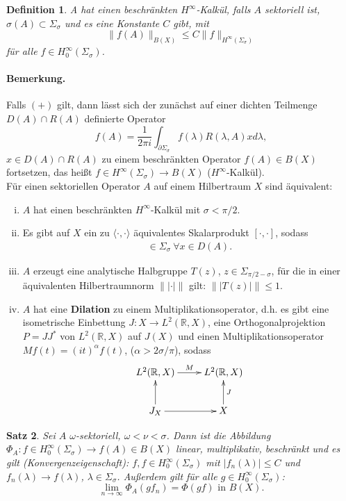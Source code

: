 \documentclass[12pt]{extreport} %
\newtheorem{Satz}{Satz}[subsection]
\newtheorem{Definition}[Satz]{Definition}
\numberwithin{equation}{section}
\newcommand{\R}{\mathbb{R}} %
\newcommand{\om}{\omega}
\newcommand{\m}{\cdot}
\begin{document}
	\begin{Definition}
		A hat einen beschränkten $H^\infty$-Kalkül, falls $A$ sektoriell ist, $\sigma(A)\subset \Sigma_\sigma$ und es eine Konstante $C$ gibt, mit 
		$$\|f(A)\|_{B(X)} \leq C\|f\|_{H^\infty(\Sigma_\sigma)}$$ 
		für alle $f\in H_0^\infty(\Sigma_\sigma)$.
	\end{Definition}
	
	\paragraph{Bemerkung.} Falls $(+)$ gilt, dann lässt sich der zunächst auf einer dichten Teilmenge $D(A)\cap R(A)$ definierte Operator
	$$f(A) = \frac{1}{2\pi i} \int_{\partial \Sigma_\sigma} f(\lambda) R(\lambda, A) xd\lambda,$$
	$x\in D(A)\cap R(A)$ zu einem beschränkten Operator $f(A) \in B(X)$ fortsetzen, das heißt $f\in H^\infty(\Sigma_\sigma)\rightarrow B(X)$ ($H^\infty$-Kalkül).\\
	
	Für einen sektoriellen Operator $A$ auf einem Hilbertraum $X$ sind äquivalent:
	\begin{enumerate}[(i)]
		\item $A$ hat einen beschränkten $H^\infty$-Kalkül mit $\sigma<\pi/2$.
		\item Es gibt auf $X$ ein zu $\langle\m,\m\rangle$ äquivalentes Skalarprodukt $[\m,\m]$, sodass 
		\begin{align*}
			[Ax,x]\in \Sigma_\sigma ~ \forall x\in D(A).
		\end{align*}
		\item $A$ erzeugt eine analytische Halbgruppe $T(z)$, $z\in \Sigma_{\pi/2 - \sigma}$, für die in einer äquivalenten Hilbertraumnorm $\||\m|\|$ gilt: $\|| T(z)|\| \leq 1$.
		\item $A$ hat eine \textbf{Dilation} zu einem Multiplikationsoperator, d.h. es gibt eine isometrische Einbettung $J\colon X\rightarrow L^2(\R, X)$, eine Orthogonalprojektion $P = JJ^*$ von $L^2(\R, X)$ auf $J(X)$ und einen Multiplikationsoperator $Mf(t) = (it)^\alpha f(t)$, ($\alpha >2\sigma/\pi$), sodass
		$$\xymatrix{
			L^2(\R,X)\ar[r]^M & L^2(\R, X)\\
			J_X\ar[r] \ar[u] & X\ar[u]_J
			}$$
	\end{enumerate}
	
	\begin{Satz}
		Sei $A$ $\om$-sektoriell, $\om<\nu<\sigma$. Dann ist die Abbildung $\Phi_A\colon f\in H_0^\infty(\Sigma_\sigma) \rightarrow f(A) \in B(X)$ linear, multiplikativ, beschränkt und es gilt (Konvergenzeigenschaft): $f, f\in H_0^\infty(\Sigma_\sigma)$ mit $|f_n(\lambda)|\leq C$ und $f_n(\lambda)\rightarrow f(\lambda)$, $\lambda\in \Sigma_\sigma$. Außerdem gilt für alle $g\in H_0^\infty(\Sigma_\sigma)$:
		$$\lim\limits_{n\rightarrow\infty} \Phi_A(gf_n) = \Phi(gf)\text{ in } B(X).$$
	\end{Satz}
	
\end{document}
